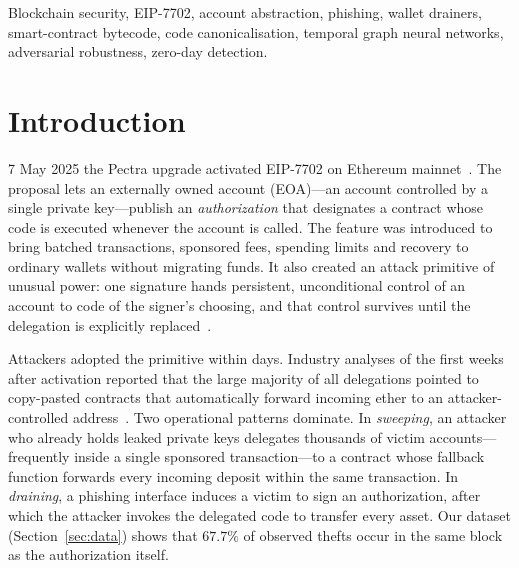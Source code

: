 \documentclass[journal]{IEEEtran}
\begin{document}
\begin{IEEEkeywords}
Blockchain security, EIP-7702, account abstraction, phishing, wallet drainers, smart-contract bytecode, code canonicalisation, temporal graph neural networks, adversarial robustness, zero-day detection.
\end{IEEEkeywords}

\section{Introduction}
\label{sec:intro}

 7 May 2025 the Pectra upgrade activated EIP-7702 on Ethereum mainnet~\cite{eip7702}. The proposal lets an externally owned account (EOA)---an account controlled by a single private key---publish an \emph{authorization} that designates a contract whose code is executed whenever the account is called. The feature was introduced to bring batched transactions, sponsored fees, spending limits and recovery to ordinary wallets without migrating funds. It also created an attack primitive of unusual power: one signature hands persistent, unconditional control of an account to code of the signer's choosing, and that control survives until the delegation is explicitly replaced~\cite{qi2025eip7702phishing}.

Attackers adopted the primitive within days. Industry analyses of the first weeks after activation reported that the large majority of all delegations pointed to copy-pasted contracts that automatically forward incoming ether to an attacker-controlled address~\cite{wintermute2025}. Two operational patterns dominate. In \emph{sweeping}, an attacker who already holds leaked private keys delegates thousands of victim accounts---frequently inside a single sponsored transaction---to a contract whose fallback function forwards every incoming deposit within the same transaction. In \emph{draining}, a phishing interface induces a victim to sign an authorization, after which the attacker invokes the delegated code to transfer every asset. Our dataset (Section~\ref{sec:data}) shows that $67.7\%$ of observed thefts occur in the same block as the authorization itself.
\end{document}
